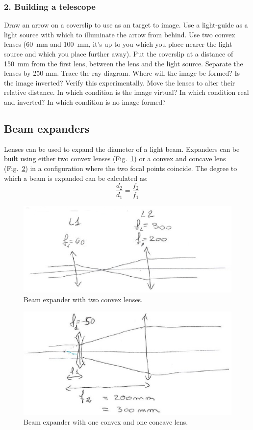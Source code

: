 \documentclass[a4paper]{report}
\begin{document}
\subsubsection{2. Building a telescope}
Draw an arrow on a coverslip to use as an target to image. Use a
light-guide as a light source with which to illuminate the arrow from
behind. Use two convex lenses (60~mm and 100~mm, it's up to you which
you place nearer the light source and which you place further
away). Put the coverslip at a distance of 150~mm from the first lens,
between the lens and the light source. Separate the lenses by 250
mm. Trace the ray diagram. Where will the image be formed? Is the
image inverted?  Verify this experimentally. Move the lenses to alter
their relative distance. In which condition is the image virtual? In
which condition real and inverted? In which condition is no image
formed?

\subsection{Beam expanders}
Lenses can be used to expand the diameter of a light beam. Expanders
can be built using either two convex lenses (Fig.~\ref{beamExpander1})
or a convex and concave lens (Fig.~\ref{beamExpander2}) in a
configuration where the two focal points coincide. The degree to
which a beam is expanded can be calculated as:
\begin{equation}
\frac{d_2}{d_1}=\frac{f_2}{f_1}
\label{eq:beamExp}
\end{equation}

\begin{figure}[h]
\center
\includegraphics[width=4.5in]{beamExpander1.eps}
\caption{Beam expander with two convex lenses.}
\label{beamExpander1}
\end{figure}

\begin{figure}[h]
\center
\includegraphics[width=4.5in]{beamExpander2.eps}
\caption{Beam expander with one convex and one concave lens.}
\label{beamExpander2}
\end{figure}
\end{document}
